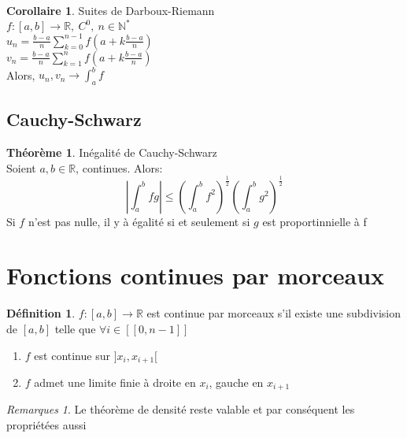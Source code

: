 \documentclass[fleqn]{article}
\theoremstyle{definition} \newtheorem*{defi}{D\'efinition}
\theoremstyle{definition} \newtheorem*{theo}{Th\'eor\`eme}
\theoremstyle{definition} \newtheorem*{coro}{Corollaire}
\theoremstyle{remark} \newtheorem*{rqs}{Remarques}
\theoremstyle{definition} \newtheorem*{prop}{Propri\'et\'e}
\begin{document}
\begin{coro} Suites de Darboux-Riemann \\
	$f:[a,b] \rightarrow \mathbb{R},\ C^0,\ n \in \mathbb{N}^*$ \\
	$u_n = \frac{b-a}{n} \sum_{k= 0}^{n-1} f(a + k\frac{b-a}{n})$ \\
	$v_n = \frac{b-a}{n} \sum_{k= 1}^{n} f(a + k\frac{b-a}{n})$ \\
	Alors, $u_n, v_n \rightarrow \int_a^b f$
\end{coro}

\subsection{Cauchy-Schwarz}
\begin{theo} In\'egalit\'e de Cauchy-Schwarz \\
	Soient $a,b \in \mathbb{R}$, continues. Alors:
	\[\left|\int_a^b fg\right| \leq \left(\int_a^b f^2\right)^\frac{1}{2} \left(\int_a^b g^2\right)^\frac{1}{2}\]
	Si $f$ n'est pas nulle, il y \`a \'egalit\'e si et seulement si $g$ est proportinnielle \`a f
\end{theo}

\section{Fonctions continues par morceaux}
\begin{defi}
	$f:[a,b] \rightarrow \mathbb{R}$ est continue par morceaux s'il existe une subdivision de $[a,b]$ telle que $\forall i \in [\![0,n-1]\!]$
	\begin{enumerate}
		\item $f$ est continue sur $]x_i, x_{i+1}[$
		\item $f$ admet une limite finie \`a droite en $x_i$, gauche en $x_{i+1}$
	\end{enumerate}
\end{defi}

\begin{rqs}
	Le th\'eor\`eme de densit\'e reste valable et par cons\'equent les propri\'et\'ees aussi
\end{rqs}
\end{document}
